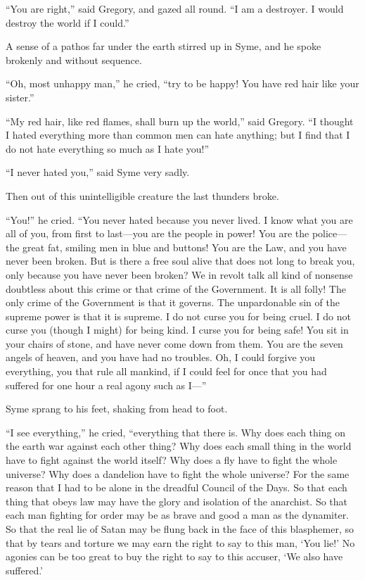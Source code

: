 “You are right,” said Gregory, and gazed all round. “I am a destroyer. I would destroy the world if I could.”

A sense of a pathos far under the earth stirred up in Syme, and he spoke brokenly and without sequence.

“Oh, most unhappy man,” he cried, “try to be happy! You have red hair like your sister.”

“My red hair, like red flames, shall burn up the world,” said Gregory. “I thought I hated everything more than common men can hate anything; but I find that I do not hate everything so much as I hate you!”

“I never hated you,” said Syme very sadly.

Then out of this unintelligible creature the last thunders broke.

“You!” he cried. “You never hated because you never lived. I know what you are all of you, from first to last⁠—you are the people in power! You are the police⁠—the great fat, smiling men in blue and buttons! You are the Law, and you have never been broken. But is there a free soul alive that does not long to break you, only because you have never been broken? We in revolt talk all kind of nonsense doubtless about this crime or that crime of the Government. It is all folly! The only crime of the Government is that it governs. The unpardonable sin of the supreme power is that it is supreme. I do not curse you for being cruel. I do not curse you (though I might) for being kind. I curse you for being safe! You sit in your chairs of stone, and have never come down from them. You are the seven angels of heaven, and you have had no troubles. Oh, I could forgive you everything, you that rule all mankind, if I could feel for once that you had suffered for one hour a real agony such as I⁠—”

Syme sprang to his feet, shaking from head to foot.

“I see everything,” he cried, “everything that there is. Why does each thing on the earth war against each other thing? Why does each small thing in the world have to fight against the world itself? Why does a fly have to fight the whole universe? Why does a dandelion have to fight the whole universe? For the same reason that I had to be alone in the dreadful Council of the Days. So that each thing that obeys law may have the glory and isolation of the anarchist. So that each man fighting for order may be as brave and good a man as the dynamiter. So that the real lie of Satan may be flung back in the face of this blasphemer, so that by tears and torture we may earn the right to say to this man, ‘You lie!’ No agonies can be too great to buy the right to say to this accuser, ‘We also have suffered.’

